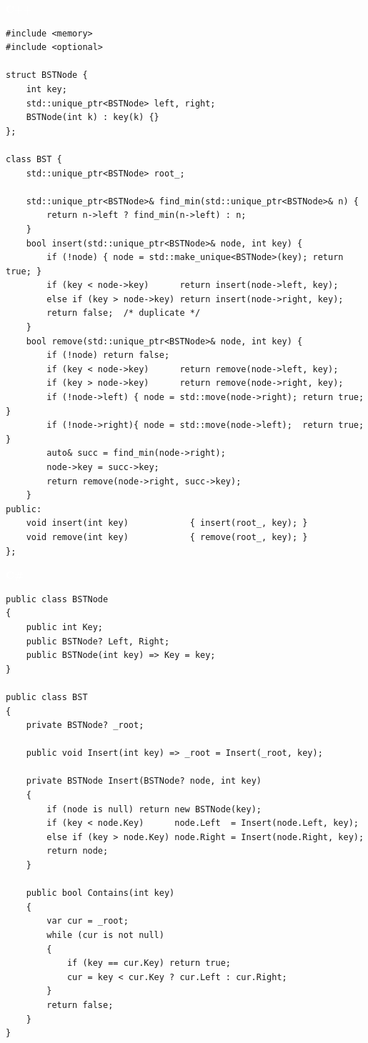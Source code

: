 \documentclass[12pt,a4paper,fontset=fandol]{ctexbook}
\newcommand{\cpplabel}{%
  \noindent\begin{tcolorbox}[sharp corners,colback=cppheadbg,colframe=cppheadbg,
    left=6pt,right=6pt,top=2pt,bottom=2pt,boxrule=0pt]
  \textcolor{white}{\small\bfseries\sffamily C++}\end{tcolorbox}%
}
\newcommand{\csharplabel}{%
  \noindent\begin{tcolorbox}[sharp corners,colback=csharpheadbg,colframe=csharpheadbg,
    left=6pt,right=6pt,top=2pt,bottom=2pt,boxrule=0pt]
  \textcolor{white}{\small\bfseries\sffamily C\#}\end{tcolorbox}%
}
\begin{document}
\cpplabel
\begin{lstlisting}[style=cppstyle]
#include <memory>
#include <optional>

struct BSTNode {
    int key;
    std::unique_ptr<BSTNode> left, right;
    BSTNode(int k) : key(k) {}
};

class BST {
    std::unique_ptr<BSTNode> root_;

    std::unique_ptr<BSTNode>& find_min(std::unique_ptr<BSTNode>& n) {
        return n->left ? find_min(n->left) : n;
    }
    bool insert(std::unique_ptr<BSTNode>& node, int key) {
        if (!node) { node = std::make_unique<BSTNode>(key); return true; }
        if (key < node->key)      return insert(node->left, key);
        else if (key > node->key) return insert(node->right, key);
        return false;  /* duplicate */
    }
    bool remove(std::unique_ptr<BSTNode>& node, int key) {
        if (!node) return false;
        if (key < node->key)      return remove(node->left, key);
        if (key > node->key)      return remove(node->right, key);
        if (!node->left) { node = std::move(node->right); return true; }
        if (!node->right){ node = std::move(node->left);  return true; }
        auto& succ = find_min(node->right);
        node->key = succ->key;
        return remove(node->right, succ->key);
    }
public:
    void insert(int key)            { insert(root_, key); }
    void remove(int key)            { remove(root_, key); }
};
\end{lstlisting}

\csharplabel
\begin{lstlisting}[style=csharpstyle]
public class BSTNode
{
    public int Key;
    public BSTNode? Left, Right;
    public BSTNode(int key) => Key = key;
}

public class BST
{
    private BSTNode? _root;

    public void Insert(int key) => _root = Insert(_root, key);

    private BSTNode Insert(BSTNode? node, int key)
    {
        if (node is null) return new BSTNode(key);
        if (key < node.Key)      node.Left  = Insert(node.Left, key);
        else if (key > node.Key) node.Right = Insert(node.Right, key);
        return node;
    }

    public bool Contains(int key)
    {
        var cur = _root;
        while (cur is not null)
        {
            if (key == cur.Key) return true;
            cur = key < cur.Key ? cur.Left : cur.Right;
        }
        return false;
    }
}
\end{lstlisting}
\end{document}
